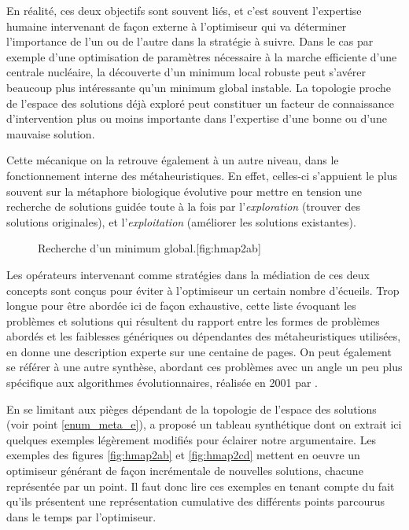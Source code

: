 En réalité, ces deux objectifs sont souvent liés, et c'est souvent l'expertise humaine intervenant de façon externe à l'optimiseur qui va déterminer l'importance de l'un ou de l'autre dans la stratégie à suivre. Dans le cas par exemple d'une optimisation de paramètres nécessaire à la marche efficiente d'une centrale nucléaire, la découverte d'un minimum local robuste peut s'avérer beaucoup plus intéressante qu'un minimum global instable. La topologie proche de l'espace des solutions déjà exploré peut constituer un facteur de connaissance d'intervention plus ou moins importante dans l'expertise d'une bonne ou d'une mauvaise solution. 

Cette mécanique on la retrouve également à un autre niveau, dans le fonctionnement interne des métaheuristiques. En effet, celles-ci s'appuient le plus souvent sur la métaphore biologique évolutive pour mettre en tension une recherche de solutions guidée toute à la fois par l'\textit{exploration} (trouver des solutions originales), et l'\textit{exploitation} (améliorer les solutions existantes). 

\begin{figure}[!htbp]
\begin{sidecaption}[fortoc]{Recherche d'un minimum global.}[fig:hmap2ab]
 \centering
 \qquad
\end{sidecaption}
\end{figure}

Les opérateurs intervenant comme stratégies dans la médiation de ces deux concepts sont conçus pour éviter à l'optimiseur un certain nombre d'écueils. Trop longue pour être abordée ici de façon exhaustive, cette liste évoquant les problèmes et solutions qui résultent du rapport entre les formes de problèmes abordés et les faiblesses génériques ou dépendantes des métaheuristiques utilisées, \textcite{Weise2011} en donne une description experte sur une centaine de pages. On peut également se référer à une autre synthèse, abordant ces problèmes avec un angle un peu plus spécifique aux algorithmes évolutionnaires, réalisée en 2001 par \textcite[316-445]{Deb2001}.

En se limitant aux pièges dépendant de la topologie de l'espace des solutions (voir point \ref{enum_meta_e}), \textcite[140]{Weise2011} a proposé un tableau synthétique dont on extrait ici quelques exemples légèrement modifiés pour éclairer notre argumentaire. Les exemples des figures \ref{fig:hmap2ab} et \ref{fig:hmap2cd} mettent en oeuvre un optimiseur générant de façon incrémentale de nouvelles solutions, chacune représentée par un point. Il faut donc lire ces exemples en tenant compte du fait qu'ils présentent une représentation cumulative des différents points parcourus dans le temps par l'optimiseur.

